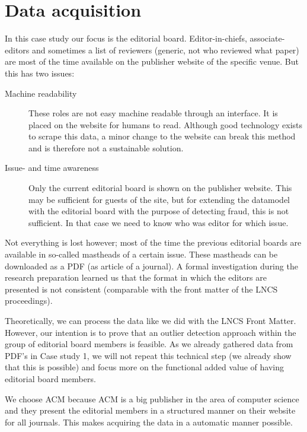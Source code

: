 \documentclass{ou-report}
\begin{document}
\section{Data acquisition}
In this case study our focus is the editorial board. Editor-in-chiefs, 
associate-editors and sometimes a list of reviewers (generic, not who reviewed 
what paper) are most of the time available on the publisher website of the 
specific venue. But this has two issues:
\begin{description}
    \item[Machine readability] These roles are not easy machine readable 
    through an interface. It is placed on the website for humans to read. 
    Although good technology exists to scrape this data, a minor change to 
    the website can break this method and is therefore not a sustainable
    solution.
    \item[Issue- and time awareness] Only the current editorial board is 
    shown on the publisher website. This may be sufficient for guests of the 
    site, but for extending the datamodel with the editorial board with the 
    purpose of detecting fraud, this is not sufficient. In that case we need 
    to know who was editor for which issue. 
\end{description}
Not everything is lost however; most of the time the previous editorial 
boards are available in so-called mastheads of a certain issue. These 
mastheads can be downloaded as a PDF (as article of a journal). A formal 
investigation during the research preparation learned us that the format in 
which the editors are presented is not consistent (comparable with the 
front matter of the LNCS proceedings).

Theoretically, we can process the data like we did with the LNCS Front 
Matter. However, our intention is to prove that an outlier detection 
approach within the group of editorial board members is feasible. As we 
already gathered data from PDF's in Case study 1, we will not repeat this 
technical step (we already show that this is possible) and focus more on 
the functional added value of having editorial board members.

We choose ACM because ACM is a big publisher in the area of computer science
and they present the editorial members in a structured manner on their 
website for all journals. This makes acquiring the data in a automatic 
manner possible.
\end{document}
